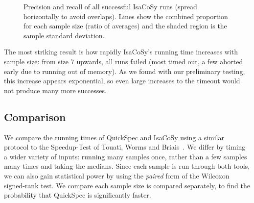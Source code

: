 \begin{figure}
  \centering
  
  \caption{Precision and recall of all successful IsaCoSy runs (spread
    horizontally to avoid overlaps). Lines show the combined proportion for each
    sample size (ratio of averages) and the shaded region is the sample standard
    deviation.}
  \label{figure:isacosy_precRec}
\end{figure}

The most striking result is how rapidly IsaCoSy's running time increases with
sample size: from size 7 upwards, all runs failed (most timed out, a few aborted
early due to running out of memory). As we found with our preliminary testing,
this increase appears exponential, so even large increases to the timeout would
not produce many more successes.


\subsection{Comparison}

We compare the running times of QuickSpec and IsaCoSy using a similar protocol
to the Speedup-Test of Touati, Worms and Briais~\cite{touati2013speedup}. We
differ by timing a wider variety of inputs: running many samples once, rather
than a few samples many times and taking the medians. Since each sample is run
through both tools, we can also gain statistical power by using the
\emph{paired} form of the Wilcoxon signed-rank test. We compare each sample size
is compared separately, to find the probability that QuickSpec is significantly
faster.






